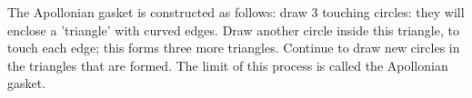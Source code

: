 The Apollonian gasket is constructed as follows:
draw 3 touching circles: they will enclose a 'triangle'
with curved edges. Draw another circle inside this triangle,
to touch each edge; this forms three more triangles.
Continue to draw new circles in the triangles that are formed.
The limit of this process is called the Apollonian gasket.